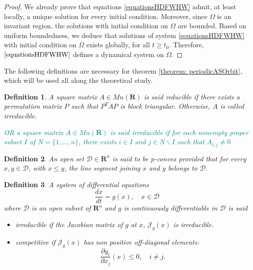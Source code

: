 \documentclass{article}
\newcommand{\marc}[1]{\textcolor{teal}{#1}}
\newtheorem{definition}{Definition}
\begin{document}
\begin{proof}
We already prove that equations \eqref{equationsHDFWHW} admit, at least locally, a unique solution for every initial condition. Moreover, since $\Omega$ is an invariant region, the solutions with initial condition on $\Omega$ are bounded. Based on uniform boundedness, we deduce that solutions of system \eqref{equationsHDFWHW} with initial condition on $\Omega$ exists globally, for all $t\geq t_0$. Therefore, $\eqref{equationsHDFWHW}$ defines a dynamical system on $\Omega$.
\end{proof}

The following definitions are necessary for theorem \ref{theorem: periodicASOrbit}, which will be used all along the theoretical study.

\begin{definition}\cite{kaszkurewicz_matrix_2012}
A square matrix $A \in Mn (\mathbf{R})$ is said reducible if there exists a permutation matrix $P$ such that $P^ T AP$ is block triangular. Otherwise, $A$ is called irreducible.

\marc{OR a square matrix $A \in Mn (\mathbf{R})$ is said irreducible if for each nonempty proper subset $I$ of $N = \{1, ..., n\}$, there exists $i \in I$ and $j \in N\backslash I$ such that $A_{i,j} \neq 0$}
\end{definition}

\begin{definition}
An open set $\mathcal{D} \in \mathbf{R}^n$ is said to be p-convex provided that for every $x, y \in \mathcal{D}$, with $x \leq y$, the line segment joining $x$ and $y$ belongs to $\mathcal{D}$.
\end{definition}

\begin{definition}\cite{smith_monotone_1995}
A system of differential equations
$$ \dfrac{d x}{dt} = g(x), \quad x \in \mathcal{D}$$
where $\mathcal{D}$ is an open subset of $\mathbf{R}^n$ and $g$ is continuously differentiable in $\mathcal{D}$ is said 

\begin{itemize}
\item irreducible if the Jacobian matrix of $g$ at $x$, $\mathcal{J}_g(x)$ is irreducible.
\item competitive if $\mathcal{J}_g(x)$ has non positive off-diagonal elements:
$$ \dfrac{\partial g_i}{\partial x_j}(x) \leq 0, \quad i \neq j.
$$
\end{itemize}

\end{definition}
\end{document}
